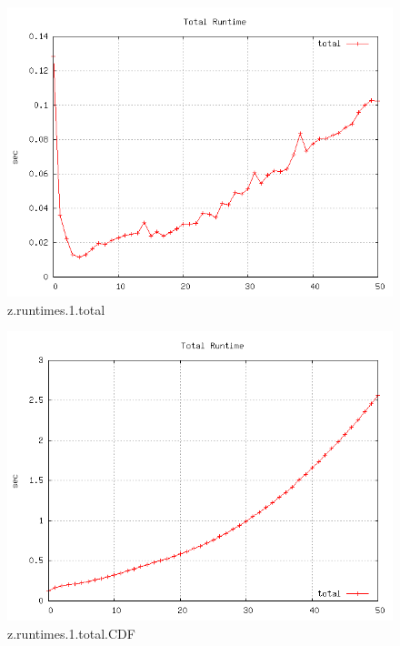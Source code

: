 \begin{figure} [h]
	\centering
	\includegraphics [scale=0.8] {plots/z.runtimes.1.total}
	\caption{z.runtimes.1.total}
	\label{plot:RANDOM_100_500 - BARABASI_ALBERT_GROWTH_10_2.z.runtimes.1.total}
\end{figure}

\begin{figure} [h]
	\centering
	\includegraphics [scale=0.8] {plots/z.runtimes.1.total.CDF}
	\caption{z.runtimes.1.total.CDF}
	\label{plot:RANDOM_100_500 - BARABASI_ALBERT_GROWTH_10_2.z.runtimes.1.total.CDF}
\end{figure}


